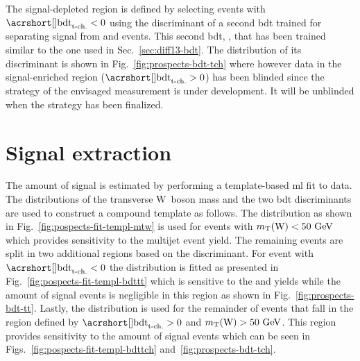 
The signal-depleted region is defined by selecting events with $\bdttch<0$ using the discriminant of a second \gls{bdt} trained for separating signal from \wjets and \ttbar events. This second \gls{bdt}, \bdttch, that has been trained similar to the one used in Sec.~\ref{sec:diff13-bdt}. The distribution of its discriminant is shown in Fig.~\ref{fig:prospects-bdt-tch} where however data in the signal-enriched region ($\bdttch>0$) has been blinded since the strategy of the envisaged measurement is under development. It will be unblinded when the strategy has been finalized.


\section{Signal extraction}
\label{sec:prospects-fit}

The amount of signal is estimated by performing a template-based \gls{ml} fit to data. The distributions of the transverse W~boson mass and the two \gls{bdt} discriminants are used to construct a compound template as follows. The \mtw distribution as shown in Fig.~\ref{fig:pospects-fit-templ-mtw} is used for events with $m_{\textrm{T}}(\textrm{W})<50~\textrm{GeV}$ which provides sensitivity to the multijet event yield. The remaining events are split in two additional regions based on the \bdttch discriminant. For event with $\bdttch<0$ the \bdttt distribution is fitted as presented in Fig.~\ref{fig:pospects-fit-templ-bdttt} which is sensitive to the \wjets and \ttbar yields while the amount of signal events is negligible in this region as shown in Fig.~\ref{fig:prospects-bdt-tt}. Lastly, the \bdttch distribution is used for the remainder of events that fall in the region defined by $\bdttch>0$ and $m_{\textrm{T}}(\textrm{W})>50~\textrm{GeV}$. This region provides sensitivity to the amount of signal events which can be seen in Figs.~\ref{fig:pospects-fit-templ-bdttch} and~\ref{fig:prospects-bdt-tch}.

